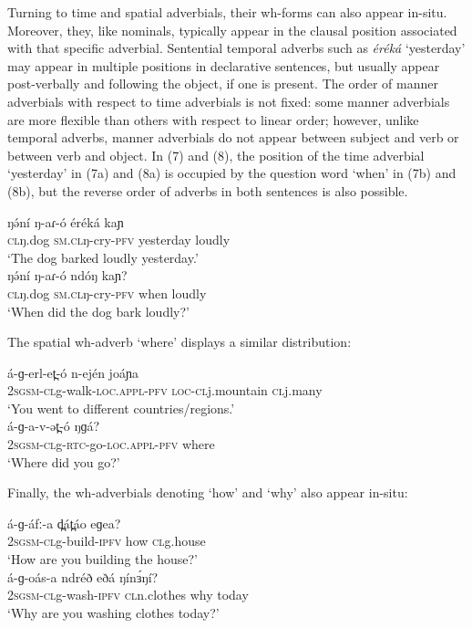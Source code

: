 Turning to time and spatial adverbials, their wh-forms can also appear in-situ.  Moreover, they, like nominals, typically appear in the clausal position associated with that specific adverbial. Sentential temporal adverbs such as \textit{éréká} ‘yesterday’ may appear in multiple positions in declarative sentences, but usually appear post-verbally and following the object, if one is present. The order of manner adverbials with respect to time adverbials is not fixed: some manner adverbials are more flexible than others with respect to linear order; however, unlike temporal adverbs, manner adverbials do not appear between subject and verb or between verb and object. In (7) and (8), the position of the time adverbial ‘yesterday’ in (7a) and (8a) is occupied by the question word ‘when’ in (7b) and (8b), but the reverse order of adverbs in both sentences is also possible. 

\ea
\ea \gll	ŋə́ní	ŋ-aɾ-ó 	éréká	kaɲ\\
		\textsc{cl}ŋ.dog	\textsc{sm.cl}ŋ-cry-\textsc{pfv}	yesterday	loudly\\
\trans		‘The dog barked loudly yesterday.’\\
\ex \gll	ŋə́ní	ŋ-aɾ-ó	ndóŋ	kaɲ?\\
		\textsc{cl}ŋ.dog	\textsc{sm.cl}ŋ-cry-\textsc{pfv}	when	loudly\\
\trans		‘When did the dog bark loudly?’\\
\z
\z

The spatial wh-adverb ‘where’ displays a similar distribution:

\ea
\ea \gll		á-ɡ-erl-et̪-ó	n-ején	joáɲa\\
		2\textsc{sgsm-cl}g-walk-\textsc{loc}.\textsc{appl}-\textsc{pfv}	\textsc{loc-}\textsc{cl}j.mountain	\textsc{cl}j.many\\
\trans           		‘You went to different countries/regions.’	\\
\ex \gll	á-ɡ-a-v-ət̪-ó	ŋɡá?		     \\
		2\textsc{sgsm-cl}g-\textsc{rtc}-go-\textsc{loc}.\textsc{appl}-\textsc{pfv}	where\\
\trans		‘Where did you go?’	  \\
\z
\z

Finally, the wh-adverbials denoting ‘how’ and ‘why’ also appear in-situ: 

\ea
\ea \gll		á-ɡ-áfː-a	d̪át̪áo	eɡea?\\
	2\textsc{sgsm-cl}g-build-\textsc{ipfv}	how	\textsc{cl}g.house \\
\trans	‘How are you building the house?’\\
\ex \gll	á-ɡ-oás-a	ndréð	eðá	ŋínɜ́ŋí?\\
	2\textsc{sgsm-cl}g-wash-\textsc{ipfv}	\textsc{cl}n.clothes	why	today\\
\trans	‘Why are you washing clothes today?’\\
\z
\z

